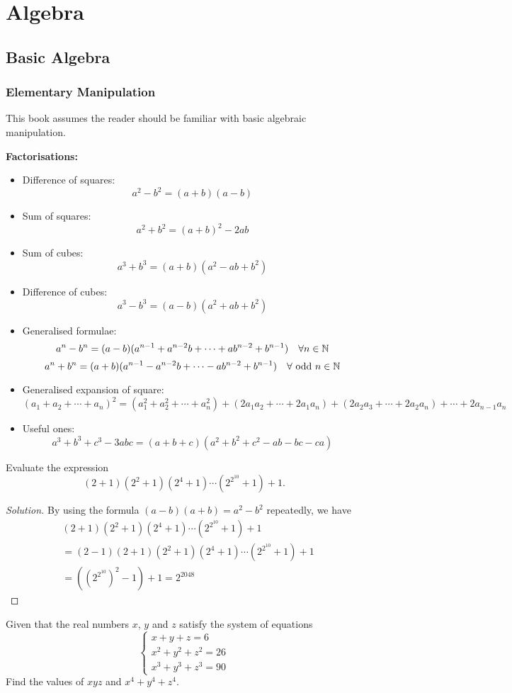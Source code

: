 \part{Algebra}
\chapter{Basic Algebra}
\section{Elementary Manipulation}
This book assumes the reader should be familiar with basic algebraic manipulation.

\textbf{Factorisations:}
\begin{itemize}
\item Difference of squares:
\[ a^2-b^2=(a+b)(a-b) \]
\item Sum of squares:
\[ a^2+b^2=(a+b)^2-2ab \]
\item Sum of cubes:
\[ a^3+b^3=(a+b)(a^2-ab+b^2) \]
\item Difference of cubes:
\[ a^3-b^3=(a-b)(a^2+ab+b^2) \]
\item Generalised formulae:
\[ a^n-b^n=(a-b)(a^{n-1}+a^{n-2}b+\cdots+ab^{n-2}+b^{n-1}) \quad \forall n\in\mathbb N \]
\[ a^n+b^n=(a+b)(a^{n-1}-a^{n-2}b+\cdots-ab^{n-2}+b^{n-1}) \quad \forall \text{ odd } n\in\mathbb N \]
\item Generalised expansion of square:
\[ (a_1+a_2+\cdots+a_n)^2=(a_1^2+a_2^2+\cdots+a_n^2)+(2a_1a_2+\cdots+2a_1a_n)+(2a_2a_3+\cdots+2a_2a_n)+\cdots+2a_{n-1}a_n \]
\item Useful ones:
\[ a^3+b^3+c^3-3abc=(a+b+c)(a^2+b^2+c^2-ab-bc-ca) \]
\end{itemize}

\begin{exmp}{}{}
Evaluate the expression
\[ (2+1)(2^2+1)(2^4+1)\cdots(2^{2^{10}}+1)+1. \]
\end{exmp}

\begin{proof}[Solution]
By using the formula $(a-b)(a+b)=a^2-b^2$ repeatedly, we have 
\begin{align*}
&(2+1)(2^2+1)(2^4+1)\cdots(2^{2^{10}}+1)+1 \\
&= (2-1)(2+1)(2^2+1)(2^4+1)\cdots(2^{2^{10}}+1)+1 \\
&= ((2^{2^{10}})^2-1)+1 = \boxed{2^{2048}}
\end{align*}
\end{proof}

\begin{exmp}{}{}
Given that the real numbers $x$, $y$ and $z$ satisfy the system of equations
\[ \begin{cases}
x + y + z = 6 \\
x^2 + y^2 + z^2 = 26 \\
x^3 + y^3 + z^3 = 90
\end{cases} \]
Find the values of $xyz$ and $x^4+y^4+z^4$.
\end{exmp}


